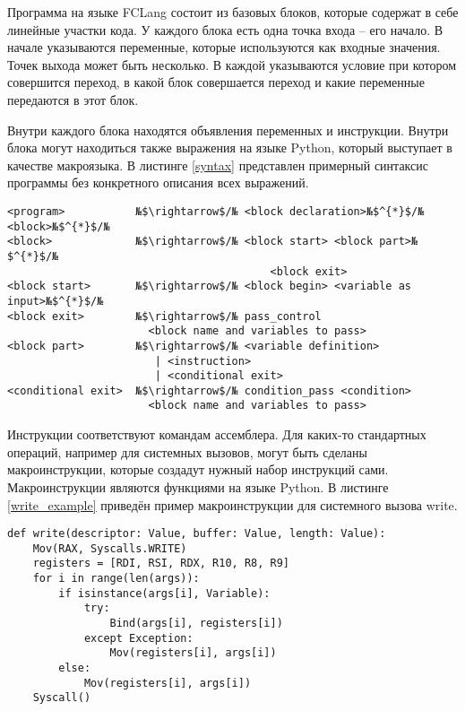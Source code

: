 \documentclass[a4paper,14pt]{extarticle}
\begin{document}
Программа на языке FCLang состоит из базовых блоков, которые содержат в себе линейные участки кода.
У каждого блока есть одна точка входа -- его начало.
В начале указываются переменные, которые используются как входные значения.
Точек выхода может быть несколько.
В каждой указываются условие при котором совершится переход, в какой блок совершается переход и какие переменные передаются в этот блок.

Внутри каждого блока находятся объявления переменных и инструкции.
Внутри блока могут находиться также выражения на языке Python, который выступает в качестве макроязыка.
В листинге \ref{syntax} представлен примерный синтаксис программы без конкретного описания всех выражений.

\begin{lstlisting}[caption=Синтаксис программы на FCLang, label=syntax]
<program>           №$\rightarrow$/№ <block declaration>№$^{*}$/№ <block>№$^{*}$/№
<block>             №$\rightarrow$/№ <block start> <block part>№$^{*}$/№
                                         <block exit>
<block start>       №$\rightarrow$/№ <block begin> <variable as input>№$^{*}$/№
<block exit>        №$\rightarrow$/№ pass_control
                      <block name and variables to pass>
<block part>        №$\rightarrow$/№ <variable definition> 
                       | <instruction>
                       | <conditional exit>
<conditional exit>  №$\rightarrow$/№ condition_pass <condition>
                      <block name and variables to pass>
\end{lstlisting}

Инструкции соответствуют командам ассемблера.
Для каких-то стандартных операций, например для системных вызовов, могут быть сделаны макроинструкции, которые создадут нужный набор инструкций сами.
Макроинструкции являются функциями на языке Python.
В листинге \ref{write_example} приведён пример макроинструкции для системного вызова write.

\begin{lstlisting}[caption=Пример макроинструкции для системного вызова write, label=write_example]
def write(descriptor: Value, buffer: Value, length: Value):
    Mov(RAX, Syscalls.WRITE)
    registers = [RDI, RSI, RDX, R10, R8, R9]
    for i in range(len(args)):
        if isinstance(args[i], Variable):
            try:
                Bind(args[i], registers[i])
            except Exception:
                Mov(registers[i], args[i])
        else:
            Mov(registers[i], args[i])
    Syscall()
\end{lstlisting}
\end{document}
